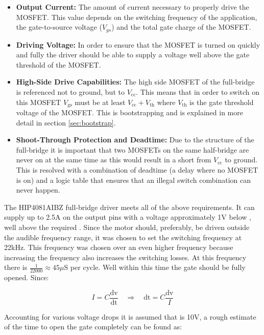 \begin{itemize}
	\item \textbf{Output Current:} The amount of current necessary to properly drive the MOSFET.
	This value depends on the switching frequency of the application, the gate-to-source voltage ($V_{gs}$) and the total gate charge of the MOSFET.
	\item \textbf{Driving Voltage:} In order to ensure that the MOSFET is turned on quickly and fully the driver should be able to supply a voltage well above the gate threshold of the MOSFET.
	\item \textbf{High-Side Drive Capabilities:} The high side MOSFET of the full-bridge is referenced not to ground, but to $V_{\text{cc}}$.
	This means that in order to switch on this MOSFET $V_{\text{gs}}$ must be at least $V_{\text{cc}}+V_{\text{th}}$ where $V_{\text{th}}$ is the gate threshold voltage of the MOSFET.
	This is bootstrapping and is explained in more detail in section \ref{sec:bootstrap}.
	\item \textbf{Shoot-Through Protection and Deadtime:} Due to the structure of the full-bridge it is important that two MOSFETs on the same half-bridge are never on at the same time as this would result in a short from $V_{\text{cc}}$ to ground.
	This is resolved with a combination of deadtime (a delay where no MOSFET is on) and a logic table that ensures that an illegal switch combination can never happen.
\end{itemize}

The HIP4081AIBZ \cite{driver} full-bridge driver meets all of the above requirements.
It can supply up to 2.5A on the output pins with a voltage approximately 1V below \vcc, well above the required \vth.
Since the motor should, preferably, be driven outside the audible frequency range, it was chosen to set the switching frequency at 22kHz.
This frequency was chosen over an even higher frequency because increasing the frequency also increases the switching losses.
At this frequency there is $\frac{1}{22000}\approx45\mu$S per cycle. 
Well within this time the gate should be fully opened.
Since:

\begin{equation}
	I = C\frac{\text{dv}}{\text{dt}} \quad\Rightarrow\quad \text{dt} = C\frac{\text{dv}}{I}
\end{equation}

Accounting for various voltage drops it is assumed that \vgs is 10V, a rough estimate of the time to open the gate completely can be found as:

